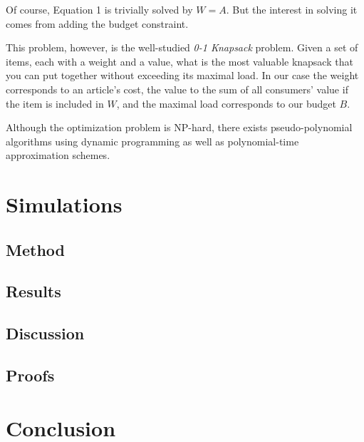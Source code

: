 \documentclass{article}
\begin{document}
Of course, Equation 1 is trivially solved by $W=A$. 
But the interest in solving it comes from adding the budget constraint.


This problem, however, is the well-studied {\em 0-1 Knapsack} problem. 
Given a set of items, each with a weight and a value, 
what is the most valuable knapsack that you can put together without exceeding its maximal load. 
In our case the weight corresponds to an article's cost, 
the value to the sum of all consumers' value if the item is included in $W$, 
and the maximal load corresponds to our budget $B$. 

Although the optimization problem is NP-hard, there exists pseudo-polynomial algorithms using dynamic programming 
as well as polynomial-time approximation schemes. 

\section{Simulations}
\subsection{Method}
\subsection{Results}
\subsection{Discussion}
\subsection{Proofs}

\section{Conclusion}



\end{document}
